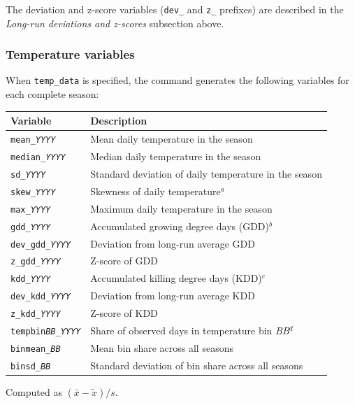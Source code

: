 The deviation and z-score variables (\texttt{dev\_} and \texttt{z\_} prefixes) are described in the \emph{Long-run deviations and z-scores} subsection above.


\subsubsection{Temperature variables}

When \texttt{temp\_data} is specified, the command generates the following variables for each complete season:

\begin{center}
\begin{threeparttable}
\begin{tabularx}{\textwidth}{lX}
\hline
Variable & Description \\ \hline
\texttt{mean\_\textit{YYYY}} & Mean daily temperature in the season \\
\texttt{median\_\textit{YYYY}} & Median daily temperature in the season \\
\texttt{sd\_\textit{YYYY}} & Standard deviation of daily temperature in the season \\
\texttt{skew\_\textit{YYYY}} & Skewness of daily temperature$^{a}$ \\
\texttt{max\_\textit{YYYY}} & Maximum daily temperature in the season \\
\texttt{gdd\_\textit{YYYY}} & Accumulated growing degree days (GDD)$^{b}$ \\
\texttt{dev\_gdd\_\textit{YYYY}} & Deviation from long-run average GDD \\
\texttt{z\_gdd\_\textit{YYYY}} & Z-score of GDD \\
\texttt{kdd\_\textit{YYYY}} & Accumulated killing degree days (KDD)$^{c}$ \\
\texttt{dev\_kdd\_\textit{YYYY}} & Deviation from long-run average KDD \\
\texttt{z\_kdd\_\textit{YYYY}} & Z-score of KDD \\
\texttt{tempbin\textit{BB}\_\textit{YYYY}} & Share of observed days in temperature bin \textit{BB}$^{d}$ \\
\texttt{binmean\_\textit{BB}} & Mean bin share across all seasons \\
\texttt{binsd\_\textit{BB}} & Standard deviation of bin share across all seasons \\
\hline
\end{tabularx}
\begin{tablenotes}
\small
\item[$^{a}$] Computed as $(\bar{x} - \tilde{x})/s$.

\end{tablenotes}
\end{threeparttable}
\end{center}
